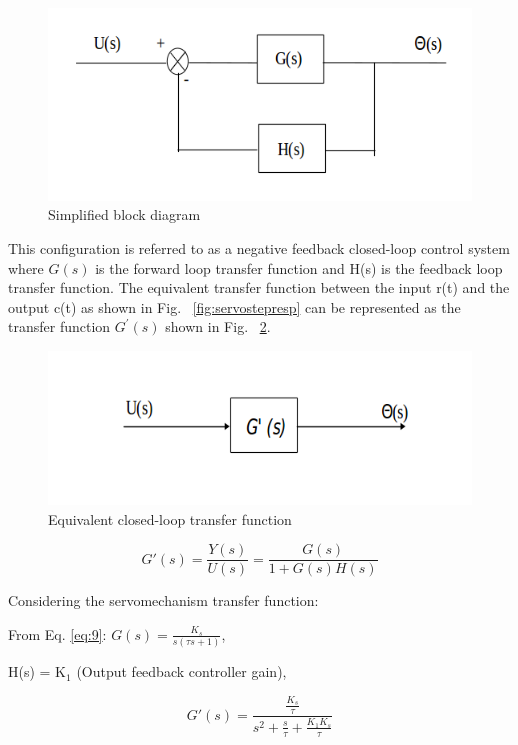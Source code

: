 \documentclass[11pt,a4paper]{article}
\begin{document}
\begin{figure}[here]
\includegraphics{imglab/servotfblock.png}
\caption{Simplified block diagram}
\label{fig:servotfblock}
\end{figure}

This configuration is referred to as a negative feedback closed-loop control system where $G(s)$ is the forward loop transfer function and H(s) is the feedback loop transfer function. The equivalent transfer function between the input r(t) and the output c(t) as shown in Fig. ~\ref{fig:servostepresp} can be represented as the transfer function $G^{\prime}(s)$ shown in Fig. ~\ref{fig:servocltfblock}.

\begin{figure}[here]
\includegraphics{imglab/servocltfblock.png}
\caption{Equivalent closed-loop transfer function}
\label{fig:servocltfblock}
\end{figure}

\begin{equation} \label{eq:15}
G'(s)=\frac{Y(s)}{U(s)}=\frac{G(s)}{1+G(s)H(s)}
\end{equation}

Considering the servomechanism transfer function:

From Eq. \ref{eq:9}: $G(s)=\frac{K_{s}}{s(\tau s + 1)}$,

H(s) = K$_{1}$ (Output feedback controller gain),

\begin{equation} \label{eq:12}
G'(s)=\frac{\frac{K_{s}}{\tau}}{s^{2} + \frac{s}{\tau} + \frac{K_{1}K_{s}}{\tau}}
\end{equation}
\end{document}
